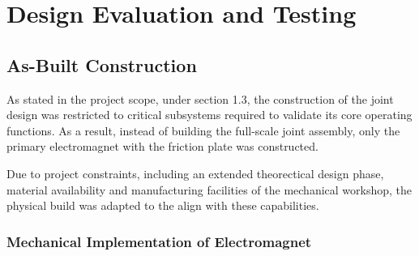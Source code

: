 \chapter{Design Evaluation and Testing}

\section{As-Built Construction}

As stated in the project scope, under section 1.3, the construction of the joint design was restricted to critical subsystems required to validate its core operating functions. As a result, instead of building the full-scale joint assembly, only the primary electromagnet with the friction plate was constructed.

Due to project constraints, including an extended theorectical design phase, material availability and manufacturing facilities of the mechanical workshop, the physical build was adapted to the align with these capabilities.

\subsection{Mechanical Implementation of Electromagnet}

